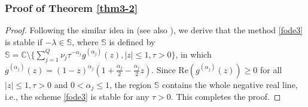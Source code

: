 \documentclass[10pt]{siamltex}
\begin{document}
\subsubsection{Proof of Theorem \ref{thm3-2}}
\begin{proof}
Following the similar idea in \cite{Lub86b} (see also \cite{Zeng14}),
we derive that the  method \eqref{fode3}  is stable if $-\lambda\in\mathbb{S}$,
where $\mathbb{S}$ is defined by
$\mathbb{S}=\mathbb{C}\setminus
 \big\{\sum_{j=1}^Q\nu_j\tau^{-\alpha_j}g^{(\alpha_j)}(z),|z|\leq1,\tau>0\big\}$,
in which
$g^{(\alpha_j)}(z)=(1-z)^{\alpha_j}\left(1+\frac{\alpha_j}{2}-\frac{\alpha_j}{2}z\right)$.
Since $\text{Re}(g^{(\alpha_j)}(z))\geq 0$ for all $|z|\leq 1,\tau>0$ and $0< \alpha_j\leq 1$,
the  region $\mathbb{S}$ contains the whole negative real line, i.e., the scheme
\eqref{fode3}  is stable for any $\tau>0$. This completes the proof.
\end{proof}
\end{document}
